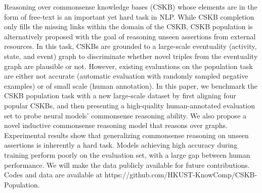 Reasoning over commonsense knowledge bases (CSKB) whose elements are in the form of free-text is an important yet hard task in NLP. While CSKB completion only fills the missing links within the domain of the CSKB, CSKB population is alternatively proposed with the goal of reasoning unseen assertions from external resources. In this task, CSKBs are grounded to a large-scale eventuality (activity, state, and event) graph to discriminate whether novel triples from the eventuality graph are plausible or not. However, existing evaluations on the population task are either not accurate (automatic evaluation with randomly sampled negative examples) or of small scale (human annotation).  In this paper, we benchmark the CSKB population task with a new large-scale dataset by first aligning four popular CSKBs, and then presenting a high-quality human-annotated evaluation set to probe neural models' commonsense reasoning ability. We also propose a novel inductive commonsense reasoning model that reasons over graphs. Experimental results show that generalizing commonsense reasoning on unseen assertions is inherently a hard task. Models achieving high accuracy during training perform poorly on the evaluation set, with a large gap between human performance. We will make the data publicly available for future contributions. Codes and data are available at https://github.com/HKUST-KnowComp/CSKB-Population.
